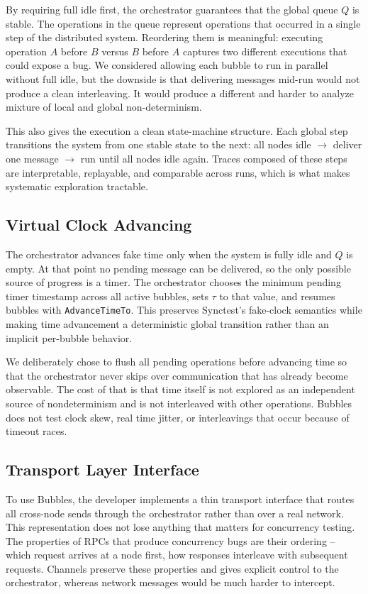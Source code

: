 \documentclass[11pt]{article}
\begin{document}
By requiring full idle first, the orchestrator guarantees that the global queue $Q$ is stable. The operations in the queue represent operations that occurred in a single step of the distributed system. Reordering them is meaningful: executing operation $A$ before $B$ versus $B$ before $A$ captures two different executions that could expose a bug. We considered allowing each bubble to run in parallel without full idle, but the downside is that delivering messages mid-run would not produce a clean interleaving. It would produce a different and harder to analyze mixture of local and global non-determinism.

This also gives the execution a clean state-machine structure. Each global step transitions the system from one stable state to the next: all nodes idle $\to$ deliver one message $\to$ run until all nodes idle again. Traces composed of these steps are interpretable, replayable, and comparable across runs, which is what makes systematic exploration tractable.


\subsection{Virtual Clock Advancing}
The orchestrator advances fake time only when the system is fully idle and $Q$ is empty. At that point no pending message can be delivered, so the only possible source of progress is a timer. The orchestrator chooses the minimum pending timer timestamp across all active bubbles, sets $\tau$ to that value, and resumes bubbles with \texttt{AdvanceTimeTo}. This preserves Synctest's fake-clock semantics while making time advancement a deterministic global transition rather than an implicit per-bubble behavior.

We deliberately chose to flush all pending operations before advancing time so that the orchestrator never skips over communication that has already become observable. The cost of that is that time itself is not explored as an independent source of nondeterminism and is not interleaved with other operations. Bubbles does not test clock skew, real time jitter, or interleavings that occur because of timeout races. 

\subsection{Transport Layer Interface}

To use Bubbles, the developer implements a thin transport interface that routes all cross-node sends through the orchestrator rather than over a real network. This representation does not lose anything that matters for concurrency testing. The properties of RPCs that produce concurrency bugs are their ordering – which request arrives at a node first, how responses interleave with subsequent requests. Channels preserve these properties and gives explicit control to the orchestrator, whereas network messages would be much harder to intercept. 
\end{document}
